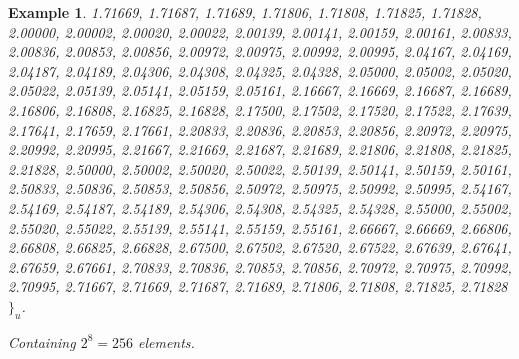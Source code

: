 \documentclass[a4paper,12pt,twoside]{memoir}
\newtheorem{example}{Example}[chapter]
\begin{document}
\begin{example}
1.71669,\allowbreak{} 1.71687,\allowbreak{} 1.71689,\allowbreak{} 1.71806,\allowbreak{} 1.71808,\allowbreak{} 1.71825,\allowbreak{} 1.71828,\allowbreak{} 2.00000,\allowbreak{} 2.00002,\allowbreak{} 2.00020,\allowbreak{} 2.00022,\allowbreak{} 2.00139,\allowbreak{} 2.00141,\allowbreak{} 2.00159,\allowbreak{} 2.00161,\allowbreak{} 2.00833,\allowbreak{} 2.00836,\allowbreak{} 2.00853,\allowbreak{} 2.00856,\allowbreak{} 2.00972,\allowbreak{} 2.00975,\allowbreak{} 2.00992,\allowbreak{} 2.00995,\allowbreak{} 2.04167,\allowbreak{} 2.04169,\allowbreak{} 2.04187,\allowbreak{} 2.04189,\allowbreak{} 2.04306,\allowbreak{} 2.04308,\allowbreak{} 2.04325,\allowbreak{} 2.04328,\allowbreak{} 2.05000,\allowbreak{} 2.05002,\allowbreak{} 2.05020,\allowbreak{} 2.05022,\allowbreak{} 2.05139,\allowbreak{} 2.05141,\allowbreak{} 2.05159,\allowbreak{} 2.05161,\allowbreak{} 2.16667,\allowbreak{} 2.16669,\allowbreak{} 2.16687,\allowbreak{} 2.16689,\allowbreak{} 2.16806,\allowbreak{} 2.16808,\allowbreak{} 2.16825,\allowbreak{} 2.16828,\allowbreak{} 2.17500,\allowbreak{} 2.17502,\allowbreak{} 2.17520,\allowbreak{} 2.17522,\allowbreak{} 2.17639,\allowbreak{} 2.17641,\allowbreak{} 2.17659,\allowbreak{} 2.17661,\allowbreak{} 2.20833,\allowbreak{} 2.20836,\allowbreak{} 2.20853,\allowbreak{} 2.20856,\allowbreak{} 2.20972,\allowbreak{} 2.20975,\allowbreak{} 2.20992,\allowbreak{} 2.20995,\allowbreak{} 2.21667,\allowbreak{} 2.21669,\allowbreak{} 2.21687,\allowbreak{} 2.21689,\allowbreak{} 2.21806,\allowbreak{} 2.21808,\allowbreak{} 2.21825,\allowbreak{} 2.21828,\allowbreak{} 2.50000,\allowbreak{} 2.50002,\allowbreak{} 2.50020,\allowbreak{} 2.50022,\allowbreak{} 2.50139,\allowbreak{} 2.50141,\allowbreak{} 2.50159,\allowbreak{} 2.50161,\allowbreak{} 2.50833,\allowbreak{} 2.50836,\allowbreak{} 2.50853,\allowbreak{} 2.50856,\allowbreak{} 2.50972,\allowbreak{} 2.50975,\allowbreak{} 2.50992,\allowbreak{} 2.50995,\allowbreak{} 2.54167,\allowbreak{} 2.54169,\allowbreak{} 2.54187,\allowbreak{} 2.54189,\allowbreak{} 2.54306,\allowbreak{} 2.54308,\allowbreak{} 2.54325,\allowbreak{} 2.54328,\allowbreak{} 2.55000,\allowbreak{} 2.55002,\allowbreak{} 2.55020,\allowbreak{} 2.55022,\allowbreak{} 2.55139,\allowbreak{} 2.55141,\allowbreak{} 2.55159,\allowbreak{} 2.55161,\allowbreak{} 2.66667,\allowbreak{} 2.66669,\allowbreak{} 2.66806,\allowbreak{} 2.66808,\allowbreak{} 2.66825,\allowbreak{} 2.66828,\allowbreak{} 2.67500,\allowbreak{} 2.67502,\allowbreak{} 2.67520,\allowbreak{} 2.67522,\allowbreak{} 2.67639,\allowbreak{} 2.67641,\allowbreak{} 2.67659,\allowbreak{} 2.67661,\allowbreak{} 2.70833,\allowbreak{} 2.70836,\allowbreak{} 2.70853,\allowbreak{} 2.70856,\allowbreak{} 2.70972,\allowbreak{} 2.70975,\allowbreak{} 2.70992,\allowbreak{} 2.70995,\allowbreak{} 2.71667,\allowbreak{} 2.71669,\allowbreak{} 2.71687,\allowbreak{} 2.71689,\allowbreak{} 2.71806,\allowbreak{} 2.71808,\allowbreak{} 2.71825,\allowbreak{} 2.71828$\}_u$.
		\endgroup
		
		\medskip
		Containing $2^8 = 256$ elements.
	\end{example}
	
\end{document}
